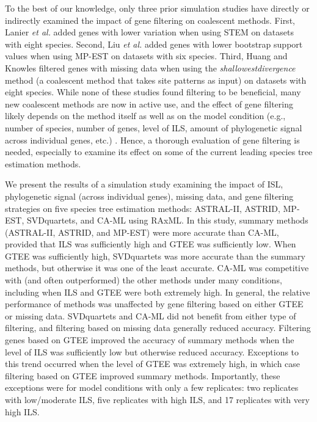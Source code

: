 To the best of our knowledge, only three prior simulation studies \cite{liu2015estimating, huang2016unforeseen, lanier2014how} have directly or indirectly examined the impact of gene filtering on coalescent methods. 
First, Lanier {\em et al.} \cite{lanier2014how} added genes with lower variation when using \gls{STEM} on datasets with eight species. 
Second, Liu {\em et al.} \cite{liu2015estimating} added genes with lower bootstrap support values when using \gls{MP-EST} on datasets with six species. 
Third, Huang and Knowles \cite{huang2016unforeseen} filtered genes with missing data when using the \textit{\gls{shallowestdivergence}} method (a coalescent method that takes site patterns as input) \cite{takahata1989gene-msd} on datasets with eight species.
While none of these studies found filtering to be beneficial, many new coalescent methods are now in active use, and the effect of gene filtering likely depends on the method itself as well as on the model condition (e.g., number of species, number of genes, level of ILS, amount of phylogenetic signal across individual genes, etc.) \cite{liu2009estimating-star}.
Hence, a thorough evaluation of gene filtering is needed, especially to examine its effect on some of the current leading species tree estimation methods.

We present the results of a simulation study examining the impact of ISL, phylogenetic signal (across individual genes), missing data, and gene filtering strategies on five species tree estimation methods: \gls{ASTRAL}-II,  \gls{ASTRID}, MP-EST, \gls{SVDquartets}, and CA-ML using \gls{RAxML}. 
In this study, summary methods (ASTRAL-II, ASTRID, and MP-EST) were more accurate than CA-ML, provided that ILS was sufficiently high and GTEE was sufficiently low. 
When GTEE was sufficiently high, SVDquartets was more accurate than the summary methods, but otherwise it was one of the least accurate. 
CA-ML was competitive with (and often outperformed) the other methods under many conditions, including when ILS and GTEE were both extremely high. 
In general, the relative performance of methods was unaffected by gene filtering based on either GTEE or missing data. 
SVDquartets and CA-ML did not benefit from either type of filtering, and filtering based on missing data generally reduced accuracy. 
Filtering genes based on GTEE improved the accuracy of summary methods when the level of ILS was sufficiently low but otherwise reduced accuracy. 
Exceptions to this trend occurred when the level of GTEE was extremely high, in which case filtering based on GTEE improved summary methods. 
Importantly, these exceptions were for model conditions with only a few replicates: two replicates with low/moderate ILS, five replicates with high ILS, and 17 replicates with very high ILS.


